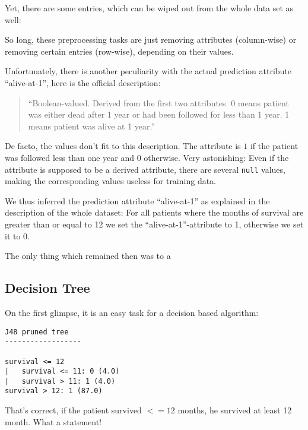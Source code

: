 \documentclass[paper=a4, fontsize=11pt]{scrartcl} %
\numberwithin{equation}{section} %
\numberwithin{figure}{section} %
\numberwithin{table}{section} %
\begin{document}
Yet, there are some entries, which can be wiped out from the whole data set as well:


So long, these preprocessing tasks are just removing attributes (column-wise) or removing certain entries (row-wise), depending on their values.

Unfortunately, there is another peculiarity with the actual prediction attribute ``alive-at-1'', here is the official description:
\begin{quotation} ``Boolean-valued. Derived from the first two attributes. 0 means patient was either dead after 1 year or had been followed for less than 1 year.  1 means patient was alive at 1 year.''\cite{uci-repo} \end{quotation}
De facto, the values don't fit to this description. The attribute is $1$ if the patient was followed less than one year and $0$ otherwise. Very astonishing: Even if the attribute is supposed to be a derived attribute, there are several \texttt{null} values, making the corresponding values useless for training data.                                                                

We thus inferred the prediction attribute ``alive-at-1'' as explained in the description of the whole dataset: For all patients where the months of survival are greater than or equal to 12 we set the ``alive-at-1''-attribute to 1, otherwise we set it to 0.

The only thing which remained then was to a


\subsection{Decision Tree}
On the first glimpse, it is an easy task for a decision based algorithm:

\begin{lstlisting}
J48 pruned tree
------------------

survival <= 12
|   survival <= 11: 0 (4.0)
|   survival > 11: 1 (4.0)
survival > 12: 1 (87.0)
\end{lstlisting}

That's correct, if the patient survived $ <= 12 $ months, he survived at least 12 month. What a statement! 
\end{document}
